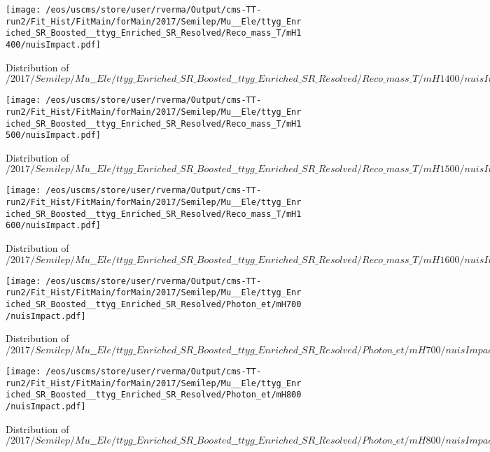 \begin{figure}
\centering
\texttt{[image: /eos/uscms/store/user/rverma/Output/cms-TT-run2/Fit\_Hist/FitMain/forMain/2017/Semilep/Mu\_\_Ele/ttyg\_Enriched\_SR\_Boosted\_\_ttyg\_Enriched\_SR\_Resolved/Reco\_mass\_T/mH1400/nuisImpact.pdf]}
\caption{Distribution of $/2017/Semilep/Mu\_\_Ele/ttyg\_Enriched\_SR\_Boosted\_\_ttyg\_Enriched\_SR\_Resolved/Reco\_mass\_T/mH1400/nuisImpact.pdf$}
\end{figure}

\begin{figure}
\centering
\texttt{[image: /eos/uscms/store/user/rverma/Output/cms-TT-run2/Fit\_Hist/FitMain/forMain/2017/Semilep/Mu\_\_Ele/ttyg\_Enriched\_SR\_Boosted\_\_ttyg\_Enriched\_SR\_Resolved/Reco\_mass\_T/mH1500/nuisImpact.pdf]}
\caption{Distribution of $/2017/Semilep/Mu\_\_Ele/ttyg\_Enriched\_SR\_Boosted\_\_ttyg\_Enriched\_SR\_Resolved/Reco\_mass\_T/mH1500/nuisImpact.pdf$}
\end{figure}

\begin{figure}
\centering
\texttt{[image: /eos/uscms/store/user/rverma/Output/cms-TT-run2/Fit\_Hist/FitMain/forMain/2017/Semilep/Mu\_\_Ele/ttyg\_Enriched\_SR\_Boosted\_\_ttyg\_Enriched\_SR\_Resolved/Reco\_mass\_T/mH1600/nuisImpact.pdf]}
\caption{Distribution of $/2017/Semilep/Mu\_\_Ele/ttyg\_Enriched\_SR\_Boosted\_\_ttyg\_Enriched\_SR\_Resolved/Reco\_mass\_T/mH1600/nuisImpact.pdf$}
\end{figure}

\begin{figure}
\centering
\texttt{[image: /eos/uscms/store/user/rverma/Output/cms-TT-run2/Fit\_Hist/FitMain/forMain/2017/Semilep/Mu\_\_Ele/ttyg\_Enriched\_SR\_Boosted\_\_ttyg\_Enriched\_SR\_Resolved/Photon\_et/mH700/nuisImpact.pdf]}
\caption{Distribution of $/2017/Semilep/Mu\_\_Ele/ttyg\_Enriched\_SR\_Boosted\_\_ttyg\_Enriched\_SR\_Resolved/Photon\_et/mH700/nuisImpact.pdf$}
\end{figure}

\begin{figure}
\centering
\texttt{[image: /eos/uscms/store/user/rverma/Output/cms-TT-run2/Fit\_Hist/FitMain/forMain/2017/Semilep/Mu\_\_Ele/ttyg\_Enriched\_SR\_Boosted\_\_ttyg\_Enriched\_SR\_Resolved/Photon\_et/mH800/nuisImpact.pdf]}
\caption{Distribution of $/2017/Semilep/Mu\_\_Ele/ttyg\_Enriched\_SR\_Boosted\_\_ttyg\_Enriched\_SR\_Resolved/Photon\_et/mH800/nuisImpact.pdf$}
\end{figure}

